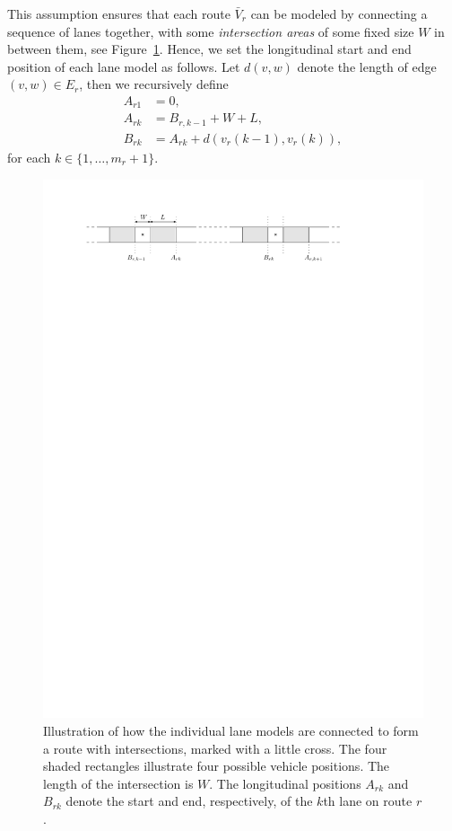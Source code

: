 \documentclass[a4paper]{report}
\theoremstyle{definition}
\theoremstyle{plain}
\begin{document}
This assumption ensures that each route $\bar{V}_{r}$ can be modeled by
connecting a sequence of lanes together, with some \emph{intersection areas} of
some fixed size $W$ in between them, see Figure~\ref{fig:intersections}.
%
Hence, we set the longitudinal start and end position of each lane model as
follows. Let $d(v, w)$ denote the length of edge $(v,w) \in E_{r}$, then we
recursively define
\begin{subequations}
\begin{align}
  A_{r1} &= 0 , \\
  A_{rk} &= B_{r,k-1} + W + L , \\
  B_{rk} &= A_{rk} + d(v_{r}(k-1), v_{r}(k)) ,
\end{align}
\end{subequations}
for each $k \in \{1, \dots, m_{r} + 1\}$.


\begin{figure}
  \centering
  \includegraphics[scale=1]{figures/motion/intersection}
  \caption{Illustration of how the individual lane models are connected to form
    a route with intersections, marked with a little cross. The four shaded
    rectangles illustrate four possible vehicle positions. The length of the
    intersection is $W$. The longitudinal positions $A_{rk}$ and $B_{rk}$ denote
    the start and end, respectively, of the $k$th lane on route $r$.}%
  \label{fig:intersections}
\end{figure}
\end{document}
